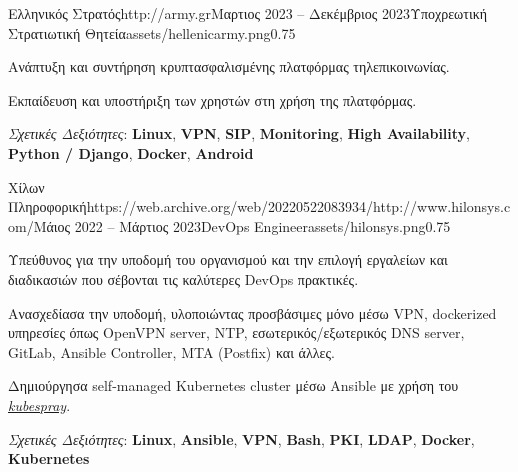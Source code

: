 \documentclass{mycv}
\begin{document}
	\vspace{0.5cm}

	\begin{EntryDatedLogo}{Ελληνικός Στρατός}{http://army.gr}{Μαρτιος 2023 -- Δεκέμβριος 2023}{Υποχρεωτική Στρατιωτική Θητεία}{assets/hellenicarmy.png}{0.75}
		\begin{Itemize}
			\item Ανάπτυξη και συντήρηση κρυπτασφαλισμένης πλατφόρμας τηλεπικοινωνίας.
			\item Εκπαίδευση και υποστήριξη των χρηστών στη χρήση της πλατφόρμας.
			\item \textit{Σχετικές Δεξιότητες}: \textbf{Linux}, \textbf{VPN}, \textbf{SIP}, \textbf{Monitoring}, \textbf{High Availability}, \textbf{Python / Django}, \textbf{Docker}, \textbf{Android}
		\end{Itemize}
	\end{EntryDatedLogo}

	\vspace{0.5cm}

	\begin{EntryDatedLogo}{Χίλων Πληροφορική}{https://web.archive.org/web/20220522083934/http://www.hilonsys.com/}{Μάιος 2022 -- Μάρτιος 2023}{DevOps Engineer}{assets/hilonsys.png}{0.75}
		\begin{Itemize}
			\item Υπεύθυνος για την υποδομή του οργανισμού και την επιλογή εργαλείων και διαδικασιών που σέβονται τις καλύτερες DevOps πρακτικές.
			\item Ανασχεδίασα την υποδομή, υλοποιώντας προσβάσιμες μόνο μέσω VPN, dockerized υπηρεσίες όπως OpenVPN server, NTP, εσωτερικός/εξωτερικός DNS server, GitLab, Ansible Controller, MTA (Postfix) και άλλες.
			\item Δημιούργησα self-managed Kubernetes cluster μέσω Ansible με χρήση του \href{https://kubespray.io/}{\textit{kubespray}}.
			\item \textit{Σχετικές Δεξιότητες}: \textbf{Linux}, \textbf{Ansible}, \textbf{VPN}, \textbf{Bash}, \textbf{PKI}, \textbf{LDAP}, \textbf{Docker}, \textbf{Kubernetes}
		\end{Itemize}
	\end{EntryDatedLogo}

	\vspace{0.5cm}
\end{document}
